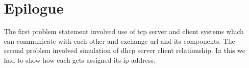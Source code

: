 \documentclass[11pt]{report}
\begin{document}
\section{Epilogue}
The first problem statement involved use of tcp server and client systems which can communicate with each other and exchange url and its components.
The second problem involved simulation of dhcp server client relationship. In this we had to show how each gets assigned its ip address.


\nocite{*}
\end{document}
